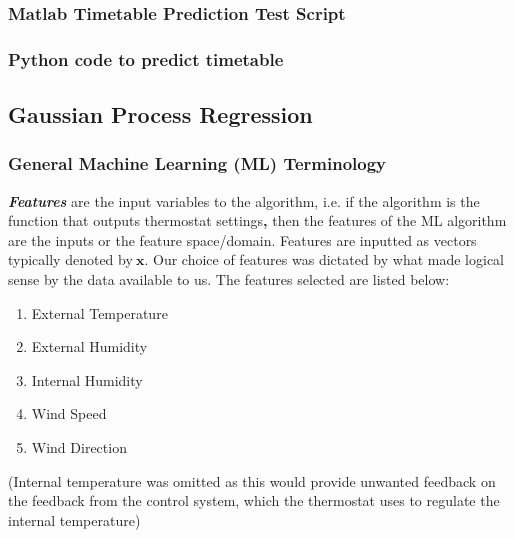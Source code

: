 \documentclass[10.5pt,a4paper,twoside]{report}   %
\begin{document}
\subsubsection{Matlab Timetable Prediction Test Script}
\label{sec:matlabttpredict}


\subsubsection{Python code to predict timetable}
\label{sec:py-sqlttpred}


\subsection{Gaussian Process Regression}

\subsubsection{General Machine Learning (ML) Terminology}


\textbf{\textit{Features}} are the input variables to the algorithm, i.e. if the algorithm is the function that outputs thermostat settings\textbf{,} then the features of the ML algorithm are the inputs or the feature space/domain. Features are inputted as vectors typically denoted by$\ {\mathbf x}$. Our choice of features was dictated by what made logical sense by the data available to us. The features selected are listed below:
\begin{enumerate}
\item  External Temperature

\item  External Humidity

\item  Internal Humidity

\item  Wind Speed

\item  Wind Direction
\end{enumerate}

\noindent (Internal temperature was omitted as this would provide unwanted feedback on the feedback from the control system, which the thermostat uses to regulate the internal temperature)
\end{document}
